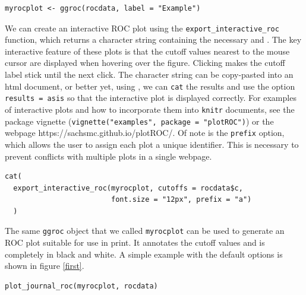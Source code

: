 \documentclass[article]{jss}
\begin{document}
\begin{verbatim}
myrocplot <- ggroc(rocdata, label = "Example")
\end{verbatim}

We can create an interactive ROC plot using the
\texttt{export\_interactive\_roc} function, which returns a character
string containing the necessary  and
. The key interactive feature of these plots is
that the cutoff values nearest to the mouse cursor are displayed when
hovering over the figure. Clicking makes the cutoff label stick until
the next click. The character string can be copy-pasted into an html
document, or better yet, using  \citep{knitr}, we can
\texttt{cat} the results and use the option
\texttt{results = \textquotesingle{}asis\textquotesingle{}} so that the
interactive plot is displayed correctly. For examples of interactive
plots and how to incorporate them into \texttt{knitr} documents, see the
package vignette (\texttt{vignette("examples", package = "plotROC")}) or
the webpage https://sachsmc.github.io/plotROC/. Of note is the
\texttt{prefix} option, which allows the user to assign each plot a
unique identifier. This is necessary to prevent conflicts with multiple
plots in a single webpage.

\begin{verbatim}
cat(
  export_interactive_roc(myrocplot, cutoffs = rocdata$c, 
                         font.size = "12px", prefix = "a")
  )
\end{verbatim}

The same \texttt{ggroc} object that we called \texttt{myrocplot} can be
used to generate an ROC plot suitable for use in print. It annotates the
cutoff values and is completely in black and white. A simple example
with the default options is shown in figure \ref{first}.

\begin{verbatim}
plot_journal_roc(myrocplot, rocdata)
\end{verbatim}
\end{document}
